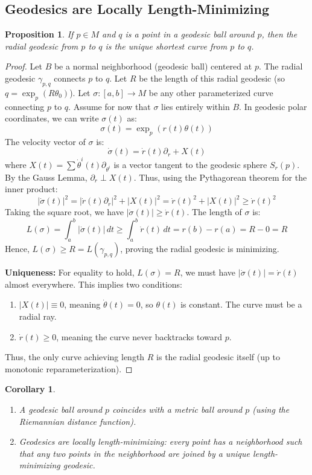 \documentclass[11pt, a4paper]{article}
\theoremstyle{plain}
\newtheorem{proposition}[theorem]{Proposition}
\newtheorem{corollary}[theorem]{Corollary}
\theoremstyle{definition}
\theoremstyle{remark}
\begin{document}
{\subsection{Geodesics are Locally Length-Minimizing}

\begin{proposition}
If $p \in M$ and $q$ is a point in a geodesic ball around $p$, then the radial geodesic from $p$ to $q$ is the unique shortest curve from $p$ to $q$.
\end{proposition}

\begin{proof}
Let $B$ be a normal neighborhood (geodesic ball) centered at $p$. The radial geodesic $\gamma_{p,q}$ connects $p$ to $q$. Let $R$ be the length of this radial geodesic (so $q = \exp_p(R\theta_0)$).
Let $\sigma: [a,b] \to M$ be any other parameterized curve connecting $p$ to $q$. Assume for now that $\sigma$ lies entirely within $B$.
In geodesic polar coordinates, we can write $\sigma(t)$ as:
\[ \sigma(t) = \exp_p(r(t) \theta(t)) \]
The velocity vector of $\sigma$ is:
\[ \dot{\sigma}(t) = \dot{r}(t) \partial_r + X(t) \]
where $X(t) = \sum \dot{\theta}^i(t) \partial_{\theta^i}$ is a vector tangent to the geodesic sphere $S_r(p)$.
By the Gauss Lemma, $\partial_r \perp X(t)$. Thus, using the Pythagorean theorem for the inner product:
\[ |\dot{\sigma}(t)|^2 = |\dot{r}(t) \partial_r|^2 + |X(t)|^2 = \dot{r}(t)^2 + |X(t)|^2 \ge \dot{r}(t)^2 \]
Taking the square root, we have $|\dot{\sigma}(t)| \ge \dot{r}(t)$. 
The length of $\sigma$ is:
\[ L(\sigma) = \int_a^b |\dot{\sigma}(t)| \, dt \ge \int_a^b \dot{r}(t) \, dt = r(b) - r(a) = R - 0 = R \]
Hence, $L(\sigma) \ge R = L(\gamma_{p,q})$, proving the radial geodesic is minimizing.

\textbf{Uniqueness:} For equality to hold, $L(\sigma) = R$, we must have $|\dot{\sigma}(t)| = \dot{r}(t)$ almost everywhere. This implies two conditions:
\begin{enumerate}
    \item $|X(t)| \equiv 0$, meaning $\dot{\theta}(t) = 0$, so $\theta(t)$ is constant. The curve must be a radial ray.
    \item $\dot{r}(t) \ge 0$, meaning the curve never backtracks toward $p$.
\end{enumerate}
Thus, the only curve achieving length $R$ is the radial geodesic itself (up to monotonic reparameterization).
\end{proof}

\begin{corollary}
\begin{enumerate}
    \item A geodesic ball around $p$ coincides with a metric ball around $p$ (using the Riemannian distance function).
    \item Geodesics are locally length-minimizing: every point has a neighborhood such that any two points in the neighborhood are joined by a unique length-minimizing geodesic.
\end{enumerate}
\end{corollary}


}
\end{document}
